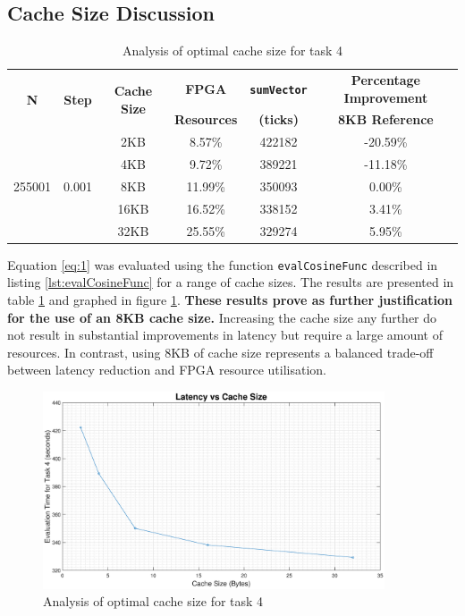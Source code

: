 \documentclass{article}
\begin{document}
\subsection{Cache Size Discussion}

\begin{table}[H]
  \centering
    \begin{tabular}{|c|c|c|c|c|c|}
    \hline
    \multirow{2}{*}{\textbf{N}} & \multirow{2}{*}{\textbf{Step}} & \multirow{2}[2]{*}{\textbf{Cache Size}} & \textbf{FPGA} & \textbf{{\tt sumVector}} & \textbf{Percentage Improvement}\\
          &       &       & \textbf{Resources} & \textbf{(ticks)} & \textbf{8KB Reference}\\
    \hline
    \multirow{5}{*}{255001} & \multirow{5}{*}{0.001} & 2KB   & 8.57\% & 422182 & -20.59\% \\
\cline{3-6}          &       & 4KB   & 9.72\% & 389221 & -11.18\% \\
\cline{3-6}          &       & 8KB   & 11.99\% & 350093 & 0.00\% \\
\cline{3-6}          &       & 16KB  & 16.52\% & 338152 & 3.41\% \\
\cline{3-6}          &       & 32KB  & 25.55\% & 329274 & 5.95\% \\
    \hline
    \end{tabular}%
  \caption{Analysis of optimal cache size for task 4}
  \label{tab:task4_cache_size}%
\end{table}%

Equation \ref{eq:1} was evaluated using the function {\tt evalCosineFunc} described in listing \ref{lst:evalCosineFunc} for a range of cache sizes. The results are presented in table \ref{tab:task4_cache_size} and graphed in figure \ref{fig:task4_caches}. \textbf{These results prove as further justification for the use of an 8KB cache size.} Increasing the cache size any further do not result in substantial improvements in latency but require a large amount of resources. In contrast, using 8KB of cache size represents a balanced trade-off between latency reduction and FPGA resource utilisation.\\


\begin{figure}[H]
    \centering
    \includegraphics[width=0.9\textwidth]{graph3.eps}
    \caption{Analysis of optimal cache size for task 4}
    \label{fig:task4_caches}
\end{figure}
\end{document}
